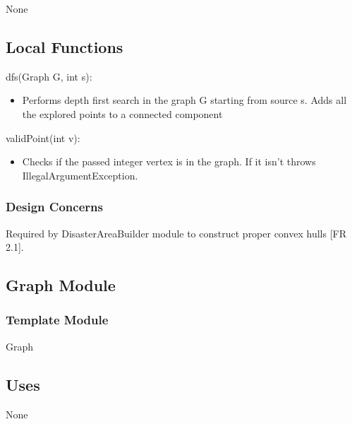 \documentclass[12pt]{article}
\begin{document}
                None
                
               \subsection*{Local Functions}
                   \noindent dfs(Graph G, int s):
                    \begin{itemize}
                        \item Performs depth first search in the graph G starting from source s. Adds all the explored points to a connected component

                    \end{itemize}
                    \noindent validPoint(int v):
                    \begin{itemize}
                        \item Checks if the passed integer vertex is in the graph. If it isn't throws IllegalArgumentException.

                    \end{itemize}
                    
                \subsubsection* {Design Concerns}
                Required by DisasterAreaBuilder module to construct proper convex hulls [FR 2.1].
                \newpage
                \subsection* {Graph Module}
                \subsubsection*{Template Module}
                
                Graph 
                
                \subsection* {Uses}
                
                None
                
\end{document}
